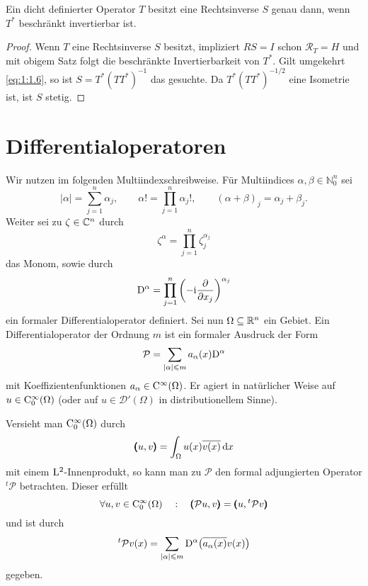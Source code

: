 \begin{cor}\label{cor:1:1.3}
Ein dicht definierter Operator $T$ besitzt eine Rechtsinverse $S$ genau dann, wenn $T^*$ beschränkt invertierbar ist.
\end{cor}
\begin{proof}
Wenn $T$ eine Rechtsinverse $S$ besitzt, impliziert $RS=I$ schon $\mathcal R_T=H$ und mit obigem Satz folgt die beschränkte Invertierbarkeit von $T^*$. Gilt umgekehrt \eqref{eq:1:1.6}, so ist $S=T^*(TT^*)^{-1}$ das gesuchte. Da $T^*(TT^*)^{-1/2}$ eine Isometrie ist, ist $S$ stetig.
\end{proof}

\section{Differentialoperatoren} 
Wir nutzen im folgenden Multiindexschreibweise. Für Multiindices $\alpha,\beta\in\mathbb N_0^n$ sei
\begin{equation}
|\alpha|=\sum_{j=1}^n \alpha_j,\qquad \alpha! = \prod_{j=1}^n \alpha_j!,\qquad (\alpha+\beta)_j=\alpha_j+\beta_j.
\end{equation} 
Weiter sei zu $\zeta\in\mathbb C^n$ durch
\begin{equation}
   \zeta^\alpha = \prod_{j=1}^n \zeta_j^{\alpha_j}
\end{equation}
das Monom, sowie durch
\begin{equation}
   \mathrm D^\alpha = \prod_{j=1}^n \left(- \mathrm i \frac{\partial}{\partial x_j}\right)^{\alpha_j}
\end{equation}
ein formaler Differentialoperator definiert. Sei nun $\Omega\subseteq\mathbb R^n$ ein Gebiet. Ein Differentialoperator der Ordnung $m$ ist ein formaler Ausdruck der Form
\begin{equation}
   \mathcal P = \sum_{|\alpha|\leqslant m} a_\alpha(x) \mathrm D^\alpha
\end{equation}
mit Koeffizientenfunktionen $a_\alpha\in \mathrm C^\infty(\Omega)$. Er agiert in nat\"urlicher Weise auf $u\in\mathrm C^\infty_0(\Omega)$ (oder auf $u\in\mathscr D'(\Omega)$ in distributionellem Sinne).

Versieht man $\mathrm C_0^\infty(\Omega)$ durch
\begin{equation}
    \pmb(u,v\pmb) = \int_{\Omega} u(x) \overline{v(x)} \,\mathrm d x
\end{equation}
mit einem $\mathrm L^2$-Innenprodukt, so kann man zu $\mathcal P$ den formal adjungierten Operator ${}^t\mathcal P$ betrachten. Dieser erf\"ullt
\begin{equation}
   \forall u,v\in\mathrm C_0^\infty(\Omega)\quad:\quad \pmb(\mathcal Pu,v\pmb)=\pmb(u,{}^t{\mathcal P}v\pmb)
\end{equation}
und ist durch
\begin{equation}
  {}^t{ \mathcal P}v(x) = \sum_{|\alpha|\leqslant m}  \mathrm D^\alpha\big(\overline{a_\alpha(x)}v(x)\big)
\end{equation}
gegeben.

